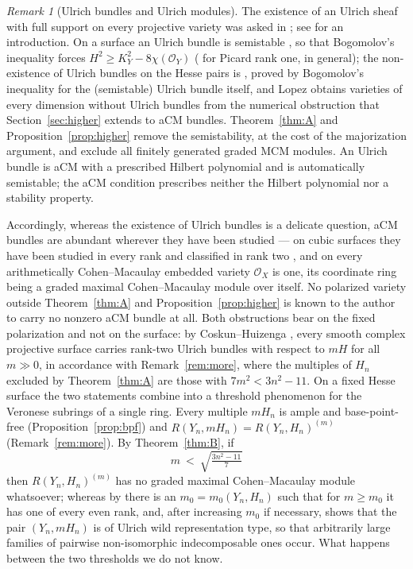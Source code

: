 \documentclass[11pt]{amsart}
\theoremstyle{remark}
\newtheorem{remark}[theorem]{Remark}
\theoremstyle{definition}
\newcommand{\cO}{\mathcal{O}}
\begin{document}
\begin{remark}[Ulrich bundles and Ulrich modules]
The existence of an Ulrich sheaf with full support on every projective variety was asked in \cite{ES}; see \cite{Be} for an introduction. On a surface an Ulrich bundle is semistable \cite[Thm.~2.9]{CHGS}, so that Bogomolov's inequality forces $H^2\ge K_Y^2-8\chi(\cO_Y)$ (\cite{Be17} for Picard rank one, \cite{An} in general); the non-existence of Ulrich bundles on the Hesse pairs is \cite[Thm.~1.2]{An}, proved by Bogomolov's inequality for the (semistable) Ulrich bundle itself, and Lopez \cite{Lo} obtains varieties of every dimension without Ulrich bundles from the numerical obstruction that Section~\ref{sec:higher} extends to aCM bundles. Theorem~\ref{thm:A} and Proposition~\ref{prop:higher} remove the semistability, at the cost of the majorization argument, and exclude all finitely generated graded MCM modules. An Ulrich bundle is aCM with a prescribed Hilbert polynomial and is automatically semistable; the aCM condition prescribes neither the Hilbert polynomial nor a stability property.

Accordingly, whereas the existence of Ulrich bundles is a delicate question, aCM bundles are abundant wherever they have been studied --- on cubic surfaces they have been studied in every rank and classified in rank two \cite{CH,Fa}, and on every arithmetically Cohen--Macaulay embedded variety $\cO_X$ is one, its coordinate ring being a graded maximal Cohen--Macaulay module over itself. No polarized variety outside Theorem~\ref{thm:A} and Proposition~\ref{prop:higher} is known to the author to carry no nonzero aCM bundle at all. 
Both obstructions bear on the fixed polarization and not on the surface: by Coskun--Huizenga \cite[Thm.~1.2]{CoHu}, every smooth complex projective surface carries rank-two Ulrich bundles with respect to $mH$ for all $m\gg0$, in accordance with Remark~\ref{rem:more}, where the multiples of $H_n$ excluded by Theorem~\ref{thm:A} are those with $7m^2<3n^2-11$. On a fixed Hesse surface the two statements combine into a threshold phenomenon for the Veronese subrings of a single ring. Every multiple $mH_n$ is ample and base-point-free (Proposition~\ref{prop:bpf}) and $R(Y_n,mH_n)=R(Y_n,H_n)^{(m)}$ (Remark~\ref{rem:more}). By Theorem~\ref{thm:B}, if
\[
m\ <\ \sqrt{\tfrac{3n^2-11}{7}}
\]
then $R(Y_n,H_n)^{(m)}$ has no graded maximal Cohen--Macaulay module whatsoever; whereas by \cite[Thm.~4.3]{CoHu} there is an $m_0=m_0(Y_n,H_n)$ such that for $m\ge m_0$ it has one of every even rank, and, after increasing $m_0$ if necessary, \cite[Cor.~4.5]{CoHu} shows that the pair $(Y_n,mH_n)$ is of Ulrich wild representation type, so that arbitrarily large families of pairwise non-isomorphic indecomposable ones occur. What happens between the two thresholds we do not know.


\end{remark}
\end{document}
